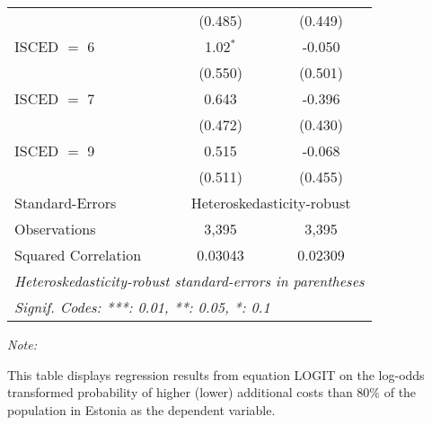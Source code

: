 \begin{table}[htbp!]
\begin{adjustbox}{width = 1\textwidth, max height = 0.95\textheight, center}
\begin{threeparttable}[b]
\begin{tabular}{lcc}
                                 & (0.485)        & (0.449)\\   
            ISCED $=$ 6          & 1.02$^{*}$     & -0.050\\   
                                 & (0.550)        & (0.501)\\   
            ISCED $=$ 7          & 0.643          & -0.396\\   
                                 & (0.472)        & (0.430)\\   
            ISCED $=$ 9          & 0.515          & -0.068\\   
                                 & (0.511)        & (0.455)\\   
            \midrule 
            Standard-Errors & \multicolumn{2}{c}{Heteroskedasticity-robust} \\ 
            Observations         & 3,395          & 3,395\\  
            Squared Correlation  & 0.03043        & 0.02309\\  
            \midrule \midrule
            \multicolumn{3}{l}{\emph{Heteroskedasticity-robust standard-errors in parentheses}}\\
            \multicolumn{3}{l}{\emph{Signif. Codes: ***: 0.01, **: 0.05, *: 0.1}}\\
         \end{tabular}
         
         \begin{tablenotes}\item \medskip \textit{Note:}
            \item This table displays regression results from equation LOGIT on the log-odds transformed probability of higher (lower) additional costs than 80\% of the population in Estonia as the dependent variable. 
         \end{tablenotes}
      \end{threeparttable}
   \end{adjustbox}
\end{table}


